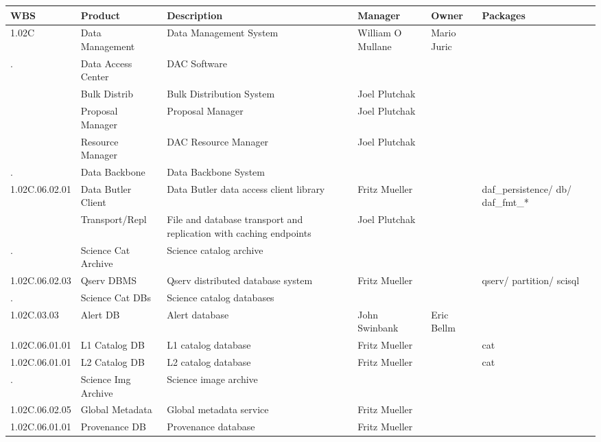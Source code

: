 

\tiny
\begin{longtable}{|p{}|p{}|p{}|p{}|p{}|p{}|}\hline
\textbf{WBS} & Product & Description & Manager & Owner & Packages\\ \hline
1.02C &  Data Management & Data Management System & William O Mullane & Mario Juric & \\ \hline
. &  Data Access Center & DAC Software &  &  & \\ \hline
 &  Bulk Distrib & Bulk Distribution System & Joel Plutchak &  & \\ \hline
 &  Proposal Manager & Proposal Manager & Joel Plutchak &  & \\ \hline
 &  Resource Manager & DAC Resource Manager & Joel Plutchak &  & \\ \hline
. &  Data Backbone & Data Backbone System &  &  & \\ \hline
1.02C.06.02.01 &  Data Butler Client & Data Butler data access client library & Fritz Mueller &  & daf\_persistence/ db/ daf\_fmt\_*\\ \hline
 &  Transport/Repl & File and database transport and replication with caching endpoints & Joel Plutchak &  & \\ \hline
. &  Science Cat Archive & Science catalog archive &  &  & \\ \hline
1.02C.06.02.03 &  Qserv DBMS & Qserv distributed database system & Fritz Mueller &  & qserv/ partition/ scisql\\ \hline
. &  Science Cat DBs & Science catalog databases &  &  & \\ \hline
1.02C.03.03 &  Alert DB & Alert database & John Swinbank & Eric Bellm & \\ \hline
1.02C.06.01.01 &  L1 Catalog DB & L1 catalog database & Fritz Mueller &  & cat\\ \hline
1.02C.06.01.01 &  L2 Catalog DB & L2 catalog database & Fritz Mueller &  & cat\\ \hline
. &  Science Img Archive & Science image archive &  &  & \\ \hline
1.02C.06.02.05 &  Global Metadata & Global metadata service & Fritz Mueller &  & \\ \hline
1.02C.06.01.01 &  Provenance DB & Provenance database & Fritz Mueller &  & \\ \hline

\end{longtable}
